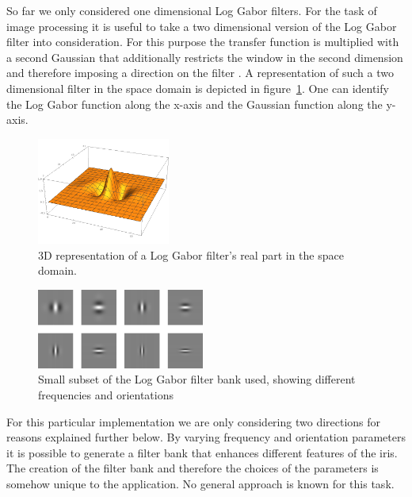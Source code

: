 \documentclass[journal]{IEEEtran}
\begin{document}
\par So far we only considered one dimensional Log Gabor filters. For the task of image processing it is useful to take a two dimensional version of the Log Gabor filter into consideration. For this purpose the transfer function is multiplied with a second Gaussian that additionally restricts the window in the second dimension and therefore imposing a direction on the filter \cite{2dloggabor}. A representation of such a two dimensional filter in the space domain is depicted in figure~\ref{fig:2Dloggabor}. One can identify the Log Gabor function along the x-axis and the Gaussian function along the y-axis.

\begin{figure}[H]
\centering
  \includegraphics[width=0.39\textwidth]{iris/log_gabor_2d.png}
	\caption{3D representation of a Log Gabor filter's real part in the space domain.}
	\label{fig:2Dloggabor}
\end{figure}

\begin{figure}[t]
	\centering
  \includegraphics[width=0.49\textwidth]{iris/2d_log_gabor_filter.png}
	\caption{Small subset of the Log Gabor filter bank used, showing different frequencies and orientations}
	\label{fig:filter_bank}
\end{figure}

\par For this particular implementation we are only considering two directions for reasons explained further below. By varying frequency and orientation parameters it is possible to generate a filter bank that enhances different features of the iris. The creation of the filter bank and therefore the choices of the parameters is somehow unique to the application. No general approach is known for this task. 
\end{document}
